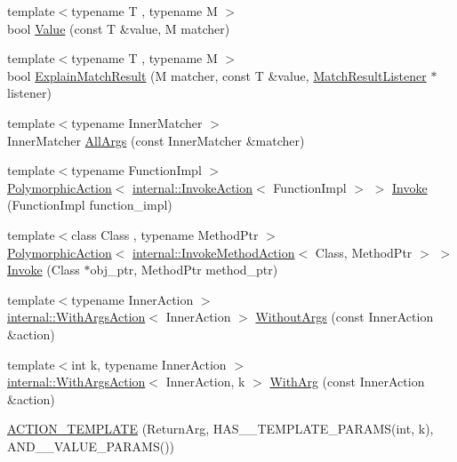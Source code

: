 \begin{DoxyCompactItemize}
{\footnotesize template$<$typename T , typename M $>$ }\\bool \hyperlink{namespacetesting_ae44c50a3a7f0a46f05c8a0b0592b4a62}{Value} (const T \&value, M matcher)
\item 
{\footnotesize template$<$typename T , typename M $>$ }\\bool \hyperlink{namespacetesting_a6d5fbd5104dafc63bf705dafbcb5ce18}{Explain\+Match\+Result} (M matcher, const T \&value, \hyperlink{classtesting_1_1MatchResultListener}{Match\+Result\+Listener} $\ast$listener)
\item 
{\footnotesize template$<$typename Inner\+Matcher $>$ }\\Inner\+Matcher \hyperlink{namespacetesting_a2522e94b71f88fbfbbcf6942cd0c6ee0}{All\+Args} (const Inner\+Matcher \&matcher)
\item 
{\footnotesize template$<$typename Function\+Impl $>$ }\\\hyperlink{classtesting_1_1PolymorphicAction}{Polymorphic\+Action}$<$ \hyperlink{classtesting_1_1internal_1_1InvokeAction}{internal\+::\+Invoke\+Action}$<$ Function\+Impl $>$ $>$ \hyperlink{namespacetesting_a12aebaf8363d49a383047529f798b694}{Invoke} (Function\+Impl function\+\_\+impl)
\item 
{\footnotesize template$<$class Class , typename Method\+Ptr $>$ }\\\hyperlink{classtesting_1_1PolymorphicAction}{Polymorphic\+Action}$<$ \hyperlink{classtesting_1_1internal_1_1InvokeMethodAction}{internal\+::\+Invoke\+Method\+Action}$<$ Class, Method\+Ptr $>$ $>$ \hyperlink{namespacetesting_a80b82dc382445d240ff011f9c34aefc4}{Invoke} (Class $\ast$obj\+\_\+ptr, Method\+Ptr method\+\_\+ptr)
\item 
{\footnotesize template$<$typename Inner\+Action $>$ }\\\hyperlink{classtesting_1_1internal_1_1WithArgsAction}{internal\+::\+With\+Args\+Action}$<$ Inner\+Action $>$ \hyperlink{namespacetesting_aeac85f74bd11112f69142e92e3a50780}{Without\+Args} (const Inner\+Action \&action)
\item 
{\footnotesize template$<$int k, typename Inner\+Action $>$ }\\\hyperlink{classtesting_1_1internal_1_1WithArgsAction}{internal\+::\+With\+Args\+Action}$<$ Inner\+Action, k $>$ \hyperlink{namespacetesting_af76590c6cecc621e1ab4b681a9ea209b}{With\+Arg} (const Inner\+Action \&action)
\item 
\hyperlink{namespacetesting_a109d48f969260878ed1e743006196992}{A\+C\+T\+I\+O\+N\+\_\+\+T\+E\+M\+P\+L\+A\+TE} (Return\+Arg, H\+A\+S\+\_\+\_\+\+T\+E\+M\+P\+L\+A\+T\+E\+\_\+\+P\+A\+R\+A\+MS(int, k), A\+N\+D\+\_\+\_\+\+V\+A\+L\+U\+E\+\_\+\+P\+A\+R\+A\+MS())

\end{DoxyCompactItemize}
